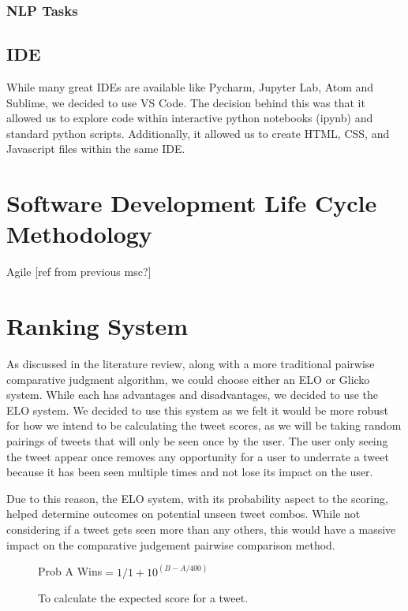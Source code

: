 	\subsubsection{NLP Tasks}
	
	
	
	\subsection{IDE}
	While many great IDEs are available like Pycharm, Jupyter Lab, Atom and Sublime, we decided to use VS Code. The decision behind this was that it allowed us to explore code within interactive python notebooks (ipynb) and standard python scripts. Additionally, it allowed us to create HTML, CSS, and Javascript files within the same IDE.
	
	\section{Software Development Life Cycle Methodology}
	Agile [ref from previous msc?]
	
	
	
	\section{Ranking System}
	
	As discussed in the literature review, along with a more traditional pairwise comparative judgment algorithm, we could choose either an ELO or Glicko system. While each has advantages and disadvantages, we decided to use the ELO system. We decided to use this system as we felt it would be more robust for how we intend to be calculating the tweet scores, as we will be taking random pairings of tweets that will only be seen once by the user. The user only seeing the tweet appear once removes any opportunity for a user to underrate a tweet because it has been seen multiple times and not lose its impact on the user. 
	
	Due to this reason, the ELO system, with its probability aspect to the scoring, helped determine outcomes on potential unseen tweet combos. While not considering if a tweet gets seen more than any others, this would have a massive impact on the comparative judgement pairwise comparison method.
	
	
	\begin{figure}[t]
		\centering
		 Prob A Wins$ = 1/1+10^{(B-A/400)}$
		\caption{To calculate the expected score for a tweet.}
		\label{fig:elo_maths_1}
	\end{figure}

